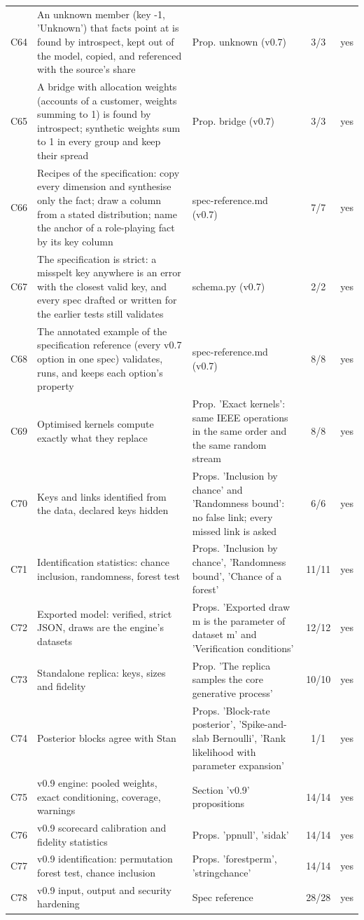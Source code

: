\begin{longtable}{@{}l p{8.2cm} p{3.6cm} c r@{}}
C64 & An unknown member (key -1, 'Unknown') that facts point at is found by introspect, kept out of the model, copied, and referenced with the source's share & Prop. unknown (v0.7) & 3/3 & yes \\
C65 & A bridge with allocation weights (accounts of a customer, weights summing to 1) is found by introspect; synthetic weights sum to 1 in every group and keep their spread & Prop. bridge (v0.7) & 3/3 & yes \\
C66 & Recipes of the specification: copy every dimension and synthesise only the fact; draw a column from a stated distribution; name the anchor of a role-playing fact by its key column & spec-reference.md (v0.7) & 7/7 & yes \\
C67 & The specification is strict: a misspelt key anywhere is an error with the closest valid key, and every spec drafted or written for the earlier tests still validates & schema.py (v0.7) & 2/2 & yes \\
C68 & The annotated example of the specification reference (every v0.7 option in one spec) validates, runs, and keeps each option's property & spec-reference.md (v0.7) & 8/8 & yes \\
C69 & Optimised kernels compute exactly what they replace & Prop. 'Exact kernels': same IEEE operations in the same order and the same random stream & 8/8 & yes \\
C70 & Keys and links identified from the data, declared keys hidden & Props. 'Inclusion by chance' and 'Randomness bound': no false link; every missed link is asked & 6/6 & yes \\
C71 & Identification statistics: chance inclusion, randomness, forest test & Props. 'Inclusion by chance', 'Randomness bound', 'Chance of a forest' & 11/11 & yes \\
C72 & Exported model: verified, strict JSON, draws are the engine's datasets & Props. 'Exported draw m is the parameter of dataset m' and 'Verification conditions' & 12/12 & yes \\
C73 & Standalone replica: keys, sizes and fidelity & Prop. 'The replica samples the core generative process' & 10/10 & yes \\
C74 & Posterior blocks agree with Stan & Props. 'Block-rate posterior', 'Spike-and-slab Bernoulli', 'Rank likelihood with parameter expansion' & 1/1 & yes \\
C75 & v0.9 engine: pooled weights, exact conditioning, coverage, warnings & Section 'v0.9' propositions & 14/14 & yes \\
C76 & v0.9 scorecard calibration and fidelity statistics & Props. 'ppnull', 'sidak' & 14/14 & yes \\
C77 & v0.9 identification: permutation forest test, chance inclusion & Props. 'forestperm', 'stringchance' & 14/14 & yes \\
C78 & v0.9 input, output and security hardening & Spec reference & 28/28 & yes \\
\bottomrule
\end{longtable}
